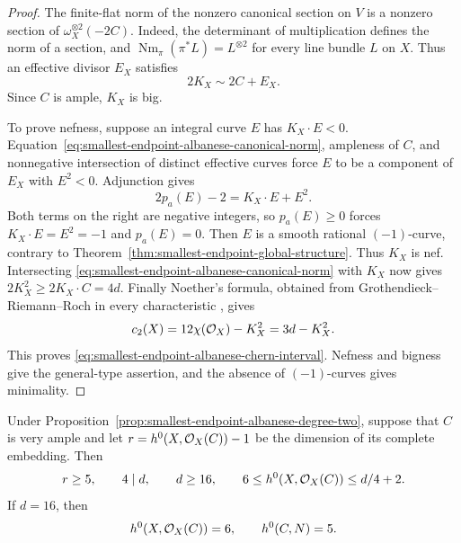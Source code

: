 \begin{proof}
The finite-flat norm of the nonzero canonical section on $V$
is a nonzero section of $\omega_X^{\otimes2}(-2C)$.
Indeed, the determinant of multiplication defines the norm of
a section, and $\operatorname{Nm}_\pi(\pi^*L)=L^{\otimes2}$
for every line bundle $L$ on $X$.
Thus an effective divisor $E_X$ satisfies
\begin{equation}\label{eq:smallest-endpoint-albanese-canonical-norm}
 2K_X\sim2C+E_X.
\end{equation}
Since $C$ is ample, $K_X$ is big.

To prove nefness, suppose an integral curve $E$ has $K_X\cdot E<0$.
Equation~\eqref{eq:smallest-endpoint-albanese-canonical-norm},
ampleness of $C$, and nonnegative intersection of distinct effective
curves force $E$ to be a component of $E_X$ with $E^2<0$.
Adjunction gives
\[
 2p_a(E)-2=K_X\cdot E+E^2.
\]
Both terms on the right are negative integers, so $p_a(E)\ge0$
forces $K_X\cdot E=E^2=-1$ and $p_a(E)=0$.
Then $E$ is a smooth rational $(-1)$-curve, contrary to
Theorem~\ref{thm:smallest-endpoint-global-structure}.
Thus $K_X$ is nef.  Intersecting
\eqref{eq:smallest-endpoint-albanese-canonical-norm} with $K_X$
now gives $2K_X^2\ge2K_X\cdot C=4d$.
Finally Noether's formula, obtained from
Grothendieck--Riemann--Roch in every characteristic
\cite[Tag~02UO]{Stacks}, gives
\[
 c_2(X)=12\chi(\mathcal O_X)-K_X^2=3d-K_X^2.
\]
This proves \eqref{eq:smallest-endpoint-albanese-chern-interval}.
Nefness and bigness give the general-type assertion, and the absence
of $(-1)$-curves gives minimality.
\end{proof}

\begin{corollary}
\label{cor:smallest-endpoint-albanese-very-ample-degree}
Under Proposition~\ref{prop:smallest-endpoint-albanese-degree-two},
suppose that $C$ is very ample and let
$r=h^0(X,\mathcal O_X(C))-1$ be the dimension of its complete embedding.
Then
\[
 r\ge5,\qquad 4\mid d,\qquad d\ge16,\qquad
 6\le h^0(X,\mathcal O_X(C))\le d/4+2.
\]
If $d=16$, then
\[
 h^0(X,\mathcal O_X(C))=6,\qquad h^0(C,N)=5.
\]
\end{corollary}

